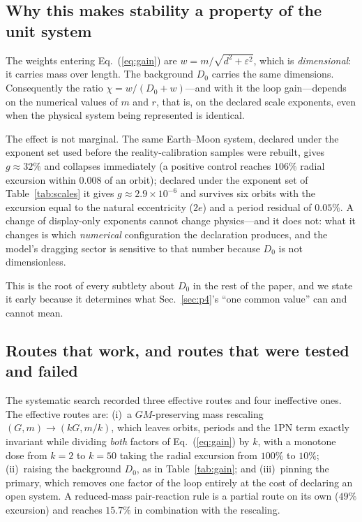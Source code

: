 \documentclass[aps,reprint,amsmath,amssymb,nofootinbib,superscriptaddress,floatfix]{revtex4-2}
\begin{document}
\subsection{Why this makes stability a property of the unit system}
\label{sec:p2units}

The weights entering Eq.~(\ref{eq:gain}) are $w=m/\sqrt{d^{2}+
\varepsilon^{2}}$, which is \emph{dimensional}: it carries mass over
length.
The background $D_0$ carries the same dimensions.
Consequently the ratio $\chi=w/(D_0+w)$---and with it the loop
gain---depends on the numerical values of $m$ and $r$, that is, on the
declared scale exponents, even when the physical system being
represented is identical.

The effect is not marginal.
The same Earth--Moon system, declared under the exponent set used
before the reality-calibration samples were rebuilt, gives
$g\approx32\%$ and collapses immediately (a positive control reaches
$106\%$ radial excursion within $0.008$ of an orbit); declared under
the exponent set of Table~\ref{tab:scales} it gives
$g\approx2.9\times10^{-6}$ and survives six orbits with the excursion
equal to the natural eccentricity ($2e$) and a period residual of
$0.05\%$.
A change of display-only exponents cannot change physics---and it does
not: what it changes is which \emph{numerical} configuration the
declaration produces, and the model's dragging sector is sensitive to
that number because $D_0$ is not dimensionless.

This is the root of every subtlety about $D_0$ in the rest of the
paper, and we state it early because it determines what
Sec.~\ref{sec:p4}'s ``one common value'' can and cannot mean.

\subsection{Routes that work, and routes that were tested and failed}
\label{sec:p2routes}

The systematic search recorded three effective routes and four
ineffective ones.
The effective routes are: (i)~a $GM$-preserving mass rescaling
$(G,m)\to(kG,m/k)$, which leaves orbits, periods and the 1PN term
exactly invariant while dividing \emph{both} factors of
Eq.~(\ref{eq:gain}) by $k$, with a monotone dose from
$k=2$ to $k=50$ taking the radial excursion from $100\%$ to $10\%$;
(ii)~raising the background $D_0$, as in Table~\ref{tab:gain}; and
(iii)~pinning the primary, which removes one factor of the loop
entirely at the cost of declaring an open system.
A reduced-mass pair-reaction rule is a partial route on its own
($49\%$ excursion) and reaches $15.7\%$ in combination with the
rescaling.
\end{document}
